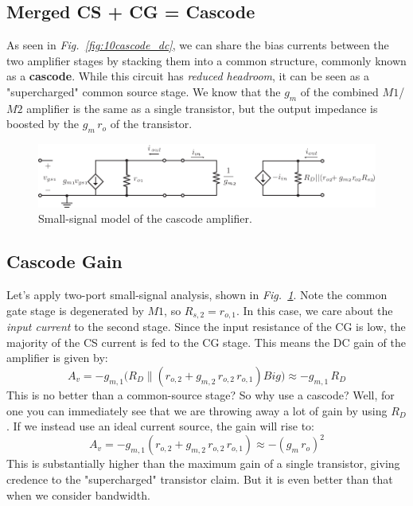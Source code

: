 \subsection{Merged CS + CG = Cascode}
As seen in \emph{Fig.~\ref{fig:10cascode_dc}}, we can share the bias currents between the two amplifier stages by stacking them into a common structure, commonly known as a \textbf{cascode}.  While this circuit has \textit{reduced headroom}, it can be seen as a "supercharged" common source stage.  We know that the $g_m$ of the combined $M1$/$M2$ amplifier is the same as a single transistor, but the output impedance is boosted by the $g_m\,r_o$ of the transistor.
\newpage
\begin{figure}[t]
\centering
\includegraphics[scale=0.98]{11cascode_ss}
\caption{Small-signal model of the cascode amplifier.}
\label{fig:11cascode_ss}
\end{figure}
\subsection{Cascode Gain}
Let's apply two-port small-signal analysis, shown in \emph{Fig.~\ref{fig:11cascode_ss}}.  Note the common gate stage is degenerated by $M1$, so $R_{s,2} = r_{o,1}$. In this case, we care about the \textit{input current }to the second stage. Since the input resistance of the CG is low, the majority of the CS current is fed to the CG stage.  This means the DC gain of the amplifier is given by:
    \begin{equation}
        A_v = -g_{m,1}\Big(R_D \parallel (r_{o,2} + g_{m,2}\,r_{o,2}\,r_{o,1})Big) \boxed{\approx -g_{m,1}\,R_D}
    \end{equation}
This is no better than a common-source stage?  So why use a cascode?  Well, for one you can immediately see that we are throwing away a lot of gain by using $R_D$.  If we instead use an ideal current source, the gain will rise to:
    \begin{equation}
        A_v = -g_{m,1}\left(r_{o,2} + g_{m,2}\,r_{o,2}\,r_{o,1}\right) \boxed{\approx -{(g_m\,r_o)}^2}
    \end{equation}
This is substantially higher than the maximum gain of a single transistor, giving credence to the "supercharged" transistor claim.  But it is even better than that when we consider bandwidth. 
